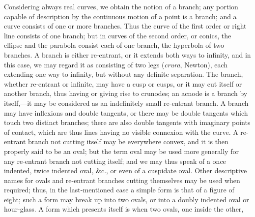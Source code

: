 \documentclass[12pt,a4paper,oneside]{book}
\begin{document}
Considering always real curves, we obtain the notion of a branch; any portion capable of description by the continuous motion of a point is a branch; and a curve consists of one or more branches. Thus the curve of the first order or right line consists of one branch; but in curves of the second order, or conics, the ellipse and the parabola consist each of one branch, the hyperbola of two branches. A branch is either re-entrant, or it extends both ways to infinity, and in this case, we may regard it as consisting of two legs (\textit{crura}, Newton), each extending one way to infinity, but without any definite separation. The branch, whether re-entrant or infinite, may have a cusp or cusps, or it may cut itself or another branch, thus having or giving rise to crunodes; an acnode is a branch by itself,---it may be considered as an indefinitely small re-entrant branch. A branch may have inflexions and double tangents, or there may be double tangents which touch two distinct branches; there are also double tangents with imaginary points of contact, which are thus lines having no visible connexion with the curve. A re-entrant branch not cutting itself may be everywhere convex, and it is then properly said to be an oval; but the term oval may be used more generally for any re-entrant branch not cutting itself; and we may thus speak of a once indented, twice indented oval, \&c., or even of a cuspidate oval. Other descriptive names for ovals and re-entrant branches cutting themselves may be used when required; thus, in the last-mentioned case a simple form is that of a figure of eight; such a form may break up into two ovals, or into a doubly indented oval or hour-glass. A form which presents itself is when two ovals, one inside the other,
\end{document}
